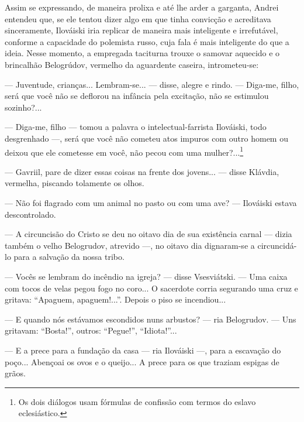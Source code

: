 Assim se expressando, de maneira prolixa e até lhe arder a garganta,
Andrei entendeu que, se ele tentou dizer algo em que tinha convicção e
acreditava sinceramente, Ilováiski iria replicar de maneira mais
inteligente e irrefutável, conforme a capacidade do polemista russo,
cuja fala é mais inteligente do que a ideia. Nesse momento, a empregada
taciturna trouxe o samovar aquecido e o brincalhão Belogrúdov, vermelho
da aguardente caseira, intrometeu-se:

--- Juventude, crianças... Lembram-se... --- disse, alegre e rindo. ---
Diga-me, filho, será que você não se deflorou na infância pela
excitação, não se estimulou sozinho?...

--- Diga-me, filho --- tomou a palavra o intelectual-farrista Ilováiski,
todo desgrenhado ---, será que você não cometeu atos impuros com outro
homem ou deixou que ele cometesse em você, não pecou com uma
mulher?...\footnote{Os dois diálogos usam fórmulas de confissão com
  termos do eslavo eclesiástico.}

--- Gavriil, pare de dizer essas coisas na frente dos jovens... ---
disse Klávdia, vermelha, piscando tolamente os olhos.

--- Não foi flagrado com um animal no pasto ou com uma ave? ---
Ilováiski estava descontrolado.

--- A circuncisão do Cristo se deu no oitavo dia de sua existência
carnal --- dizia também o velho Belogrudov, atrevido ---, no oitavo dia
dignaram-se a circuncidá-lo para a salvação da nossa tribo.

--- Vocês se lembram do incêndio na igreja? --- disse Vsesviátski. ---
Uma caixa com tocos de velas pegou fogo no coro... O sacerdote corria
segurando uma cruz e gritava: ``Apaguem, apaguem!...''. Depois o piso se
incendiou...

--- E quando nós estávamos escondidos nuns arbustos? --- ria Belogrudov.
--- Uns gritavam: ``Bosta!'', outros: ``Pegue!'', ``Idiota!''...

--- E a prece para a fundação da casa --- ria Ilováiski ---, para a
escavação do poço... Abençoai os ovos e o queijo... A prece para os que
traziam espigas de grãos.

